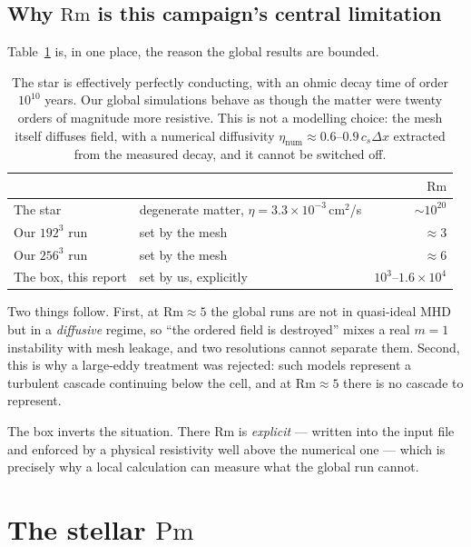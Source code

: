 \documentclass[11pt,a4paper]{article}
\newcommand{\Pm}{\mathrm{Pm}}
\newcommand{\Rm}{\mathrm{Rm}}
\begin{document}
\subsection{Why $\Rm$ is this campaign's central limitation}

Table~\ref{tab:rm} is, in one place, the reason the global results are bounded.

\begin{table}[h]
\centering\small
\begin{tabular}{llr}
\toprule
& & $\Rm$ \\
\midrule
The star & degenerate matter, $\eta = 3.3\times10^{-3}$\,cm$^2$/s & $\sim 10^{20}$ \\
Our $192^3$ run & set by the mesh & $\approx 3$ \\
Our $256^3$ run & set by the mesh & $\approx 6$ \\
The box, this report & set by us, explicitly & $10^3$--$1.6\times10^4$ \\
\bottomrule
\end{tabular}
\caption{The star is effectively perfectly conducting, with an ohmic decay time
of order $10^{10}$ years. Our global simulations behave as though the matter
were twenty orders of magnitude more resistive. This is not a modelling choice:
the mesh itself diffuses field, with a numerical diffusivity
$\eta_{\mathrm{num}} \approx 0.6$--$0.9\,c_s\Delta x$ extracted from the
measured decay, and it cannot be switched off.}
\label{tab:rm}
\end{table}

Two things follow. First, at $\Rm \approx 5$ the global runs are not in
quasi-ideal MHD but in a \emph{diffusive} regime, so ``the ordered field is
destroyed'' mixes a real $m=1$ instability with mesh leakage, and two
resolutions cannot separate them. Second, this is why a large-eddy treatment was
rejected: such models represent a turbulent cascade continuing below the cell,
and at $\Rm \approx 5$ there is no cascade to represent.

The box inverts the situation. There $\Rm$ is \emph{explicit} --- written into the
input file and enforced by a physical resistivity well above the numerical
one --- which is precisely why a local calculation can measure what the global run
cannot.

\section{The stellar $\Pm$}
\end{document}
